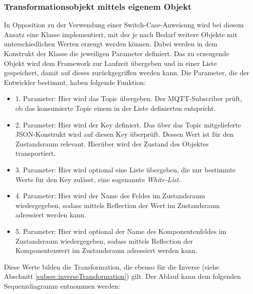     \subsubsection*{Transformationsobjekt mittels eigenem Objekt}
        In Opposition zu der Verwendung einer Switch-Case-Anweisung wird bei diesem Ansatz eine Klasse implementiert, mit der je nach Bedarf 
        weitere Objekte mit unterschiedlichen Werten erzeugt werden können. Dabei werden in dem Konstrukt der Klasse die jeweiligen Parameter 
        definiert. Das zu erzeugende Objekt wird dem Framework zur Laufzeit übergeben und in einer Liste gespeichert, damit auf dieses zurückgegriffen werden kann. 
        Die Parameter, die der Entwickler bestimmt, haben folgende Funktion:
        \begin{itemize}
            \item 1. Parameter: Hier wird das Topic übergeben. Der \acs{MQTT}-Subscriber prüft, ob das konsumierte Topic einem in der Liste definierten entspricht.
            \item 2. Parameter: Hier wird der Key definiert. Das über das Topic mitgelieferte JSON-Konstrukt wird auf diesen Key überprüft. Dessen Wert ist für den Zustandsraum relevant. Hierüber wird der Zustand des Objektes transportiert.
            \item 3. Parameter: Hier wird optional eine Liste übergeben, die nur bestimmte Werte für den Key zulässt, eine sogenannte \textit{White-List}.
            \item 4. Parameter: Hier wird der Name des Feldes im Zustandsraum wiedergegeben, sodass mittels Reflection der Wert im Zustandsraum adressiert werden kann.
            \item 5. Parameter: Hier wird optional der Name des Komponentenfeldes im Zustandsraum wiedergegeben, sodass mittels Reflection der Komponentenwert im Zustandsraum adressiert werden kann.
        \end{itemize}
        Diese Werte bilden die Transformation, die ebenso für die Inverse (siehe Abschnitt \ref{subsec:inverseTransformation}) gilt.
        Der Ablauf kann dem folgenden Sequenzdiagramm entnommen werden: 
        \\
        \pagebreak
